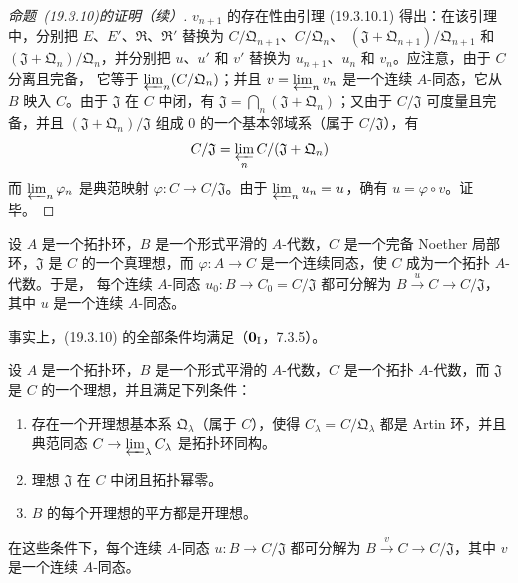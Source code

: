 \begin{proof}[命题~{\rm(19.3.10)}的证明（续）]
$v_{n+1}$ 的存在性由引理 (19.3.10.1) 得出：在该引理中，分别把
$E$、$E'$、$\mathfrak R$、$\mathfrak R'$ 替换为
$C/\mathfrak Q_{n+1}$、$C/\mathfrak Q_n$、
$(\mathfrak J+\mathfrak Q_{n+1})/\mathfrak Q_{n+1}$ 和
$(\mathfrak J+\mathfrak Q_n)/\mathfrak Q_n$，并分别把 $u$、$u'$ 和 $v'$
替换为 $u_{n+1}$、$u_n$ 和 $v_n$。应注意，由于 $C$ 分离且完备，
它等于 $\varprojlim_n(C/\mathfrak Q_n)$；并且
$v=\varprojlim_n v_n$ 是一个连续 $A$-同态，它从 $B$ 映入 $C$。由于
$\mathfrak J$ 在 $C$ 中闭，有
$\mathfrak J=\bigcap_n(\mathfrak J+\mathfrak Q_n)$；又由于
$C/\mathfrak J$ 可度量且完备，并且
$(\mathfrak J+\mathfrak Q_n)/\mathfrak J$ 组成 $0$ 的一个基本邻域系（属于
$C/\mathfrak J$），有
\[
  C/\mathfrak J=\varprojlim_n C/(\mathfrak J+\mathfrak Q_n)
\]
而 $\varprojlim_n\varphi_n$ 是典范映射 $\varphi:C\to C/\mathfrak J$。由于
$\varprojlim_n u_n=u$，确有 $u=\varphi\circ v$。证毕。
\end{proof}

\begin{corollary}[19.3.11]
\label{0.19.3.11-fr}
设 $A$ 是一个拓扑环，$B$ 是一个形式平滑的 $A$-代数，$C$ 是一个完备
Noether 局部环，$\mathfrak J$ 是 $C$ 的一个真理想，而
$\varphi:A\to C$ 是一个连续同态，使 $C$ 成为一个拓扑 $A$-代数。于是，
每个连续 $A$-同态 $u_0:B\to C_0=C/\mathfrak J$ 都可分解为
$B\xrightarrow{u}C\to C/\mathfrak J$，其中 $u$ 是一个连续 $A$-同态。
\end{corollary}

事实上，(19.3.10) 的全部条件均满足（$\mathbf 0_{\rm I}$，7.3.5）。

\begin{proposition}[19.3.12]
\label{0.19.3.12-fr}
设 $A$ 是一个拓扑环，$B$ 是一个形式平滑的 $A$-代数，$C$ 是一个拓扑
$A$-代数，而 $\mathfrak J$ 是 $C$ 的一个理想，并且满足下列条件：
\begin{enumerate}
  \item[$1^\circ$] 存在一个开理想基本系 $\mathfrak Q_\lambda$（属于 $C$），使得
  $C_\lambda=C/\mathfrak Q_\lambda$ 都是 Artin 环，并且典范同态
  $C\to\varprojlim_\lambda C_\lambda$ 是拓扑环同构。
  \item[$2^\circ$] 理想 $\mathfrak J$ 在 $C$ 中闭且拓扑幂零。
  \item[$3^\circ$] $B$ 的每个开理想的平方都是开理想。
\end{enumerate}
在这些条件下，每个连续 $A$-同态 $u:B\to C/\mathfrak J$ 都可分解为
$B\xrightarrow{v}C\to C/\mathfrak J$，其中 $v$ 是一个连续 $A$-同态。
\end{proposition}

